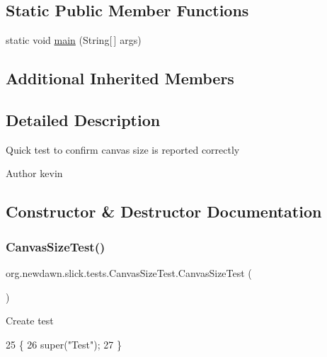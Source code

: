 \subsection*{Static Public Member Functions}
\begin{DoxyCompactItemize}
\item 
static void \mbox{\hyperlink{classorg_1_1newdawn_1_1slick_1_1tests_1_1_canvas_size_test_ae2f3f1d8c976dd08a2cca0cb6b5a878e}{main}} (String\mbox{[}$\,$\mbox{]} args)
\end{DoxyCompactItemize}
\subsection*{Additional Inherited Members}


\subsection{Detailed Description}
Quick test to confirm canvas size is reported correctly

\begin{DoxyAuthor}{Author}
kevin 
\end{DoxyAuthor}


\subsection{Constructor \& Destructor Documentation}
\mbox{\label{classorg_1_1newdawn_1_1slick_1_1tests_1_1_canvas_size_test_a2c4dfef634aa9600288b5c47120c83f7}} 
\subsubsection{\texorpdfstring{Canvas\+Size\+Test()}{CanvasSizeTest()}}
{\footnotesize\ttfamily org.\+newdawn.\+slick.\+tests.\+Canvas\+Size\+Test.\+Canvas\+Size\+Test (\begin{DoxyParamCaption}{ }\end{DoxyParamCaption})\hspace{0.3cm}{\ttfamily [inline]}}

Create test 
\begin{DoxyCode}
25                             \{
26         super(\textcolor{stringliteral}{"Test"});
27     \}
\end{DoxyCode}


